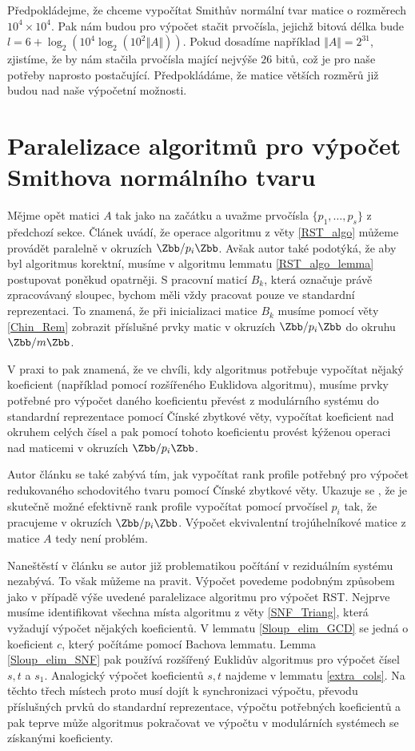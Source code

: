 Předpokládejme, že chceme vypočítat Smithův normální tvar matice o rozměrech
$ 10^4 \times 10^4 $. Pak nám budou pro výpočet stačit prvočísla, jejichž bitová
délka bude $ l = 6 + \log_2(10^4 \log_2(10^2 \Vert A \Vert)) $. Pokud dosadíme
například $ \Vert A \Vert = 2^{31} $, zjistíme, že by nám stačila prvočísla
mající nejvýše $ 26 $ bitů, což je pro naše potřeby naprosto
postačující. Předpokládáme, že matice větších rozměrů již budou nad naše výpočetní
možnosti.

\section{Paralelizace algoritmů pro výpočet Smithova normálního tvaru}
Mějme opět matici $ A $ tak jako na začátku a uvažme prvočísla
$ \{ p_1, \dots, p_s \} $ z předchozí sekce. Článek \cite[Theorem 16]{triang}
uvádí, že operace algoritmu z věty \ref{RST_algo} můžeme provádět paralelně
v okruzích $ \Zbb / p_i \Zbb $. Avšak autor také podotýká, že aby byl algoritmus
korektní, musíme v algoritmu lemmatu \ref{RST_algo_lemma} postupovat poněkud
opatrněji. S pracovní maticí $ B_k $, která označuje právě zpracovávaný sloupec,
bychom měli vždy pracovat pouze ve standardní reprezentaci. To znamená, že při
inicializaci matice $ B_k $ musíme pomocí věty \ref{Chin_Rem} zobrazit příslušné
prvky matic v okruzích $ \Zbb / p_i \Zbb $ do okruhu $ \Zbb / m \Zbb $.

V praxi to pak znamená, že ve chvíli, kdy algoritmus potřebuje vypočítat nějaký
koeficient (například pomocí rozšířeného Euklidova algoritmu), musíme prvky
potřebné pro výpočet daného koeficientu převést z modulárního systému do standardní
reprezentace pomocí Čínské zbytkové věty, vypočítat koeficient nad okruhem celých
čísel a pak pomocí tohoto koeficientu provést kýženou operaci nad maticemi v
okruzích $ \Zbb / p_i \Zbb $.

Autor článku \cite{triang} se
také zabývá tím, jak vypočítat rank profile potřebný pro výpočet redukovaného
schodovitého tvaru pomocí Čínské zbytkové věty. Ukazuje se \cite[Theorem 15]{triang},
že je skutečně možné efektivně rank profile vypočítat pomocí prvočísel $ p_i $
tak, že pracujeme v okruzích $ \Zbb / p_i \Zbb $.
Výpočet ekvivalentní trojúhelníkové matice z matice $ A $ tedy není problém.

Naneštěstí v článku \cite{SNF_Arne} se autor již problematikou počítání v
reziduálním systému nezabývá. To však můžeme na
pravit. Výpočet povedeme podobným
způsobem jako v případě výše uvedené paralelizace algoritmu pro výpočet RST.
Nejprve musíme identifikovat všechna místa algoritmu z věty \ref{SNF_Triang},
která vyžadují výpočet nějakých koeficientů. V lemmatu \ref{Sloup_elim_GCD}
se jedná o koeficient $ c $, který počítáme pomocí Bachova lemmatu. Lemma
\ref{Sloup_elim_SNF} pak používá rozšířený Euklidův algoritmus pro výpočet čísel
$ s, t $ a $ s_1 $. Analogický výpočet koeficientů $ s, t $ najdeme v lemmatu
\ref{extra_cols}. Na těchto třech místech proto musí dojít k synchronizaci výpočtu,
převodu příslušných prvků do standardní reprezentace, výpočtu potřebných
koeficientů a pak teprve může algoritmus pokračovat ve výpočtu v modulárních
systémech se získanými koeficienty.

